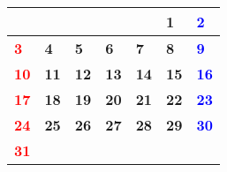 \documentclass[a4paper,landscape]{jsarticle}
\newcommand{\dig}{\hspace{29mm}}
\newcommand{\tdig}{\hspace{27mm}}
\newcommand{\LBF}{\LARGE\textbf}
\begin{document}
\begingroup
\renewcommand{\arraystretch}{4}
\begin{tabular}{|p{32mm}|p{32mm}|p{32mm}|p{32mm}|p{32mm}|p{32mm}|p{32mm}|}
\hline
&&&&&\raisebox{30pt} {\dig\LBF{1}}&\raisebox{30pt} {\dig\textcolor{blue}{\LBF{2}}}\\
\hline
\raisebox{30pt} {\dig\textcolor{red}{\LBF{3}}}&\raisebox{30pt} {\dig\LBF{4}}&\raisebox{30pt} {\dig\LBF{5}}&\raisebox{30pt} {\dig\LBF{6}}&\raisebox{30pt} {\dig\LBF{7}}&\raisebox{30pt} {\dig\LBF{8}}&\raisebox{30pt} {\dig\textcolor{blue}{\LBF{9}}}\\
\hline
\raisebox{30pt} {\tdig\textcolor{red}{\LBF{10}}}&\raisebox{30pt} {\tdig\LBF{11}}&\raisebox{30pt} {\tdig\LBF{12}}&\raisebox{30pt} {\tdig\LBF{13}}&\raisebox{30pt} {\tdig\LBF{14}}&\raisebox{30pt} {\tdig\LBF{15}}&\raisebox{30pt} {\tdig\textcolor{blue}{\LBF{16}}}\\
\hline
\raisebox{30pt} {\tdig\textcolor{red}{\LBF{17}}}&\raisebox{30pt} {\tdig\LBF{18}}&\raisebox{30pt} {\tdig\LBF{19}}&\raisebox{30pt} {\tdig\LBF{20}}&\raisebox{30pt} {\tdig\LBF{21}}&\raisebox{30pt} {\tdig\LBF{22}}&\raisebox{30pt} {\tdig\textcolor{blue}{\LBF{23}}}\\
\hline
\raisebox{30pt} {\tdig\textcolor{red}{\LBF{24}}}&\raisebox{30pt} {\tdig\LBF{25}}&\raisebox{30pt} {\tdig\LBF{26}}&\raisebox{30pt} {\tdig\LBF{27}}&\raisebox{30pt} {\tdig\LBF{28}}&\raisebox{30pt} {\tdig\LBF{29}}&\raisebox{30pt} {\tdig\textcolor{blue}{\LBF{30}}}\\
\hline
\raisebox{30pt} {\tdig\textcolor{red}{\LBF{31}}}&&&&&&\\
\hline
\end{tabular}
\endgroup
\end{document}
